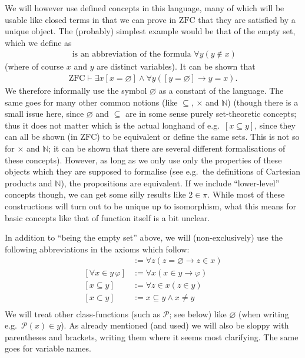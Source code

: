 \documentclass{scrartcl}
\theoremstyle{definition}
\theoremstyle{plain}
\theoremstyle{remark}
\newcommand{\N}{\ensuremath{\mathbb{N}}}
\newcommand{\ZFC}{\ensuremath{\mathrm{ZFC}}}
\newcommand{\limp}{\rightarrow}
\newcommand{\Pow}{\mathcal{P}}
\newcommand{\eqdef}{:=}
\begin{document}
We will however use defined concepts in this language, many of which will be usable like closed terms in that we can prove in $\ZFC$ that they are satisfied by a unique object. The (probably) simplest example would be that of the empty set, which we define as
\begin{align*}
  [x = \varnothing] \text{ is an abbreviation of the formula } \forall y (y \notin x)
\end{align*}
(where of course $x$ and $y$ are distinct variables). It can be shown that
\begin{align*}
  \ZFC \vdash \exists x [x = \varnothing] \land \forall y ([y = \varnothing] \limp y = x)\mbox{.}
\end{align*}
We therefore informally use the symbol $\varnothing$ as a constant of the language. The same goes for many other common notions (like $\subseteq$, $\times$ and $\N$) (though there is a small issue here, since $\varnothing$ and $\subseteq$ are in some sense purely set-theoretic concepts; thus it does not matter which is the actual longhand of e.g.~$[x \subseteq y]$, since they can all be shown (in $\ZFC$) to be equivalent or define the same sets. This is not so for $\times$ and $\N$; it can be shown that there are several different formalisations of these concepts). However, as long as we only use only the properties of these objects which they are supposed to formalise (see e.g.~the definitions of Cartesian products and $\N$), the propositions are equivalent. If we include ``lower-level'' concepts though, we can get some silly results like $2 \in \pi$. While most of these constructions will turn out to be unique up to isomorphism, what this means for basic concepts like that of function itself is a bit unclear.

In addition to ``being the empty set'' above, we will (non-exclusively) use the following abbreviations in the axioms which follow:
\begin{align*}
  [\varnothing \in x]& \eqdef \forall z (z = \varnothing \limp z \in x)\\
  [\forall x \in y \, \varphi]& \eqdef \forall x (x \in y \limp \varphi)\\
  [x \subseteq y]& \eqdef \forall z \in x (z \in y)\\
  [x \subset y]& \eqdef x \subseteq y \land x  \not= y\\
\end{align*}
We will treat other class-functions (such as $\Pow$; see below) like $\varnothing$ (when writing e.g.~$\Pow(x) \in y$). As already mentioned (and used) we will also be sloppy with parentheses and brackets, writing them where it seems most clarifying. The same goes for variable names.
\end{document}
